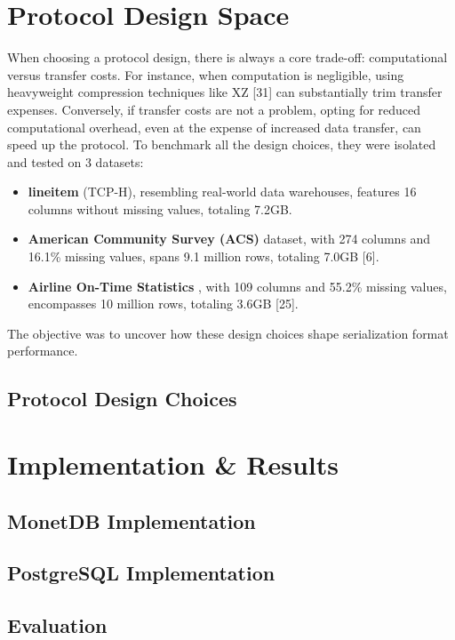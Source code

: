 \documentclass[sigconf]{acmart}
\begin{document}
\section{Protocol Design Space}
When choosing a protocol design, there is always a core trade-off: computational versus transfer costs. For instance, when computation is negligible, using heavyweight compression techniques like XZ [31] can substantially trim transfer expenses. Conversely, if transfer costs are not a problem, opting for reduced computational overhead, even at the expense of increased data transfer, can speed up the protocol.
To benchmark all the design choices, they were isolated and tested on 3 datasets:
\begin{itemize}
  \item \textbf{lineitem} (TCP-H), resembling real-world data warehouses, features 16 columns without missing values, totaling 7.2GB.
  \item \textbf{American Community Survey (ACS)} dataset, with 274 columns and 16.1\% missing values, spans 9.1 million rows, totaling 7.0GB [6].
  \item \textbf{Airline On-Time Statistics} , with 109 columns and 55.2\% missing values, encompasses 10 million rows, totaling 3.6GB [25].
\end{itemize}
The objective was to uncover how these design choices shape serialization format performance.


\subsection{Protocol Design Choices}

\section{Implementation & Results}

\subsection{MonetDB Implementation}

\subsection{PostgreSQL Implementation}

\subsection{Evaluation}
\end{document}
